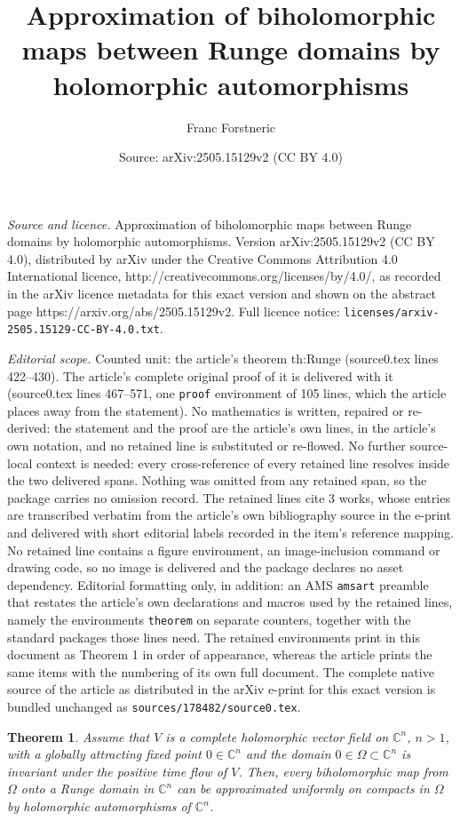 \documentclass[10pt,a4paper]{amsart}
\title{Approximation of biholomorphic maps between Runge domains by holomorphic automorphisms}
\author{Franc Forstneric}
\date{Source: arXiv:2505.15129v2 (CC BY 4.0)}
\newtheorem{theorem}{Theorem}
\newcommand\C{\mathbb{C}}
\begin{document}
\maketitle

\noindent\emph{Source and licence.} Approximation of biholomorphic maps between Runge domains by holomorphic automorphisms. Version arXiv:2505.15129v2 (CC BY 4.0), distributed by arXiv under the Creative Commons Attribution 4.0 International licence, http://creativecommons.org/licenses/by/4.0/, as recorded in the arXiv licence metadata for this exact version and shown on the abstract page https://arxiv.org/abs/2505.15129v2. Full licence notice: \texttt{licenses/arxiv-2505.15129-CC-BY-4.0.txt}.\par\smallskip

\noindent\textit{Editorial scope.} Counted unit: the article's theorem th:Runge (source0.tex lines 422--430). The article's complete original proof of it is delivered with it (source0.tex lines 467--571, one \texttt{proof} environment of 105 lines, which the article places away from the statement). No mathematics is written, repaired or re-derived: the statement and the proof are the article's own lines, in the article's own notation, and no retained line is substituted or re-flowed.  No further source-local context is needed: every cross-reference of every retained line resolves inside the two delivered spans.  Nothing was omitted from any retained span, so the package carries no omission record.  The retained lines cite 3 works, whose entries are transcribed verbatim from the article's own bibliography source in the e-print and delivered with short editorial labels recorded in the item's reference mapping.  No retained line contains a figure environment, an image-inclusion command or drawing code, so no image is delivered and the package declares no asset dependency.  Editorial formatting only, in addition: an AMS \texttt{amsart} preamble that restates the article's own declarations and macros used by the retained lines, namely the environments \texttt{theorem} on separate counters, together with the standard packages those lines need.  The retained environments print in this document as Theorem 1 in order of appearance, whereas the article prints the same items with the numbering of its own full document.  The complete native source of the article as distributed in the arXiv e-print for this exact version is bundled unchanged as \texttt{sources/178482/source0.tex}.
\begin{theorem}\label{th:Runge}
Assume that $V$ is a complete holomorphic vector field 
on $\C^n$, $n>1$, with a globally attracting 
fixed point $0\in \C^n$ and the domain $0\in \Omega\subset \C^n$
is invariant under the positive time flow of $V$.
Then, every biholomorphic map from $\Omega$ 
onto a Runge domain in $\C^n$ can be approximated uniformly 
on compacts in $\Omega$ by holomorphic automorphisms of $\C^n$.
\end{theorem}
\end{document}
